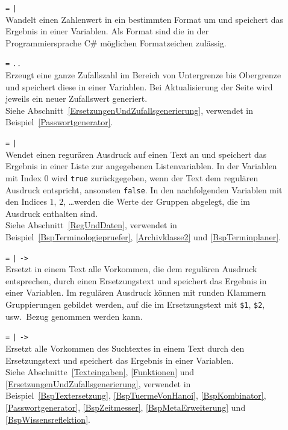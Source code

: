 \begin{description}
\item[]  \verb|=|  \verb=|= \\
Wandelt einen Zahlenwert in ein bestimmten Format um und speichert das Ergebnis in einer Variablen. Als Format sind die in der Programmiersprache C\# möglichen Formatzeichen zulässig. 

\item[]  \verb|=|  \verb|..| \\
Erzeugt eine ganze Zufallszahl im Bereich von Untergrenze bis Obergrenze und speichert diese in einer Variablen.
Bei Aktualisierung der Seite wird jeweils ein neuer Zufallswert generiert.\\
Siehe Abschnitt~\ref{ErsetzungenUndZufallsgenerierung}, verwendet in Beispiel~\ref{Passwortgenerator}.

\item[]  \verb|=|  \verb=|= \\
Wendet einen regurären Ausdruck auf einen Text an und speichert das Ergebnis in einer Liste zur angegebenen Listenvariablen. In der Variablen mit Index $0$ wird \verb|true| zurückgegeben, wenn der Text dem regulären Ausdruck entspricht, ansonsten \verb|false|. In den nachfolgenden Variablen mit den Indices $1$, $2$, \dots werden die Werte der Gruppen abgelegt, die im Ausdruck enthalten sind.\\
Siehe Abschnitt~\ref{RegUndDaten}, verwendet in Beispiel~\ref{BspTerminologiepruefer}, \ref{Archivklasse2} und \ref{BspTerminplaner}.

\item[]  \verb|=|  \verb=|=  \verb|->| \\
Ersetzt in einem Text alle Vorkommen, die dem regulären Ausdruck entsprechen, durch einen Ersetzungstext und speichert das Ergebnis in einer Variablen. Im regulären Ausdruck können mit runden Klammern Gruppierungen gebildet werden, auf die im Ersetzungstext mit \verb|$1|, \verb|$2|, usw.\ Bezug genommen werden kann.
 
\item[]  \verb|=|  \verb=|=  \verb|->| \\
Ersetzt alle Vorkommen des Suchtextes in einem Text durch den Ersetzungstext und speichert das Ergebnis in einer Variablen.\\
Siehe Abschnitte~\ref{Texteingaben}, \ref{Funktionen} und \ref{ErsetzungenUndZufallsgenerierung}, verwendet in Beispiel~\ref{BspTextersetzung}, \ref{BspTuermeVonHanoi}, \ref{BspKombinator}, \ref{Passwortgenerator}, \ref{BspZeitmesser}, \ref{BspMetaErweiterung} und \ref{BspWissensreflektion}.


\end{description}
